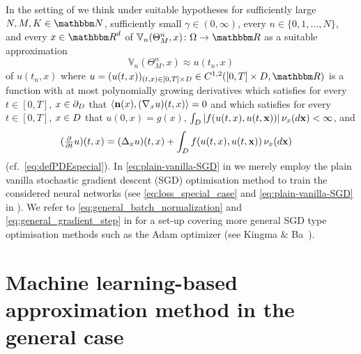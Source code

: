 %
%
In the setting of  we think under suitable hypotheses for sufficiently large  
$N, M, K \in \N$, sufficiently small 
$\gamma \in (0,\infty)$, every 
$n \in \{0, 1, \dots, N\}$, and every $x \in \R^d$ of $\mathbb V_n(\Theta^n_M,x)\colon \Omega \to \R$ as a suitable approximation
\begin{equation}
\mathbb V_n(\Theta^n_M,x) \approx u(t_n,x) %
\end{equation}
of $u(t_n,x)$
where
$
u=
(u(t,x))_{(t,x)\in [0,T]\times\D}\in C^{1,2}([0,T]\times\D,\R)
$
is a function with at most polynomially growing derivatives
which satisfies for every
$t\in [0,T]$,
$x\in \partial_D$
that
$ \left<{\textbf n}(x) ,(\nabla_x u)(t,x)\right> = 0$
and which satisfies for every
$t\in [0,T]$,
$x\in D$
that
$u(0,x)=g(x)$,
$\int_D |f(u(t,x), \allowbreak u(t,{\textbf x})) | \, \nu_x(d{\textbf x}) < \infty$,
and
\begin{equation}
\begin{split}
(\tfrac{\partial}{\partial t}u)(t,x)
&=  (\Delta_x u)(t,x)
+
\int_{D} f(u(t,x),u(t,{\textbf x})) \, \nu_x(d{\textbf x})
\end{split}
\end{equation}
(cf.\ \eqref{eq:defPDEspecial}). In \eqref{eq:plain-vanilla-SGD} in  we merely employ the plain vanilla stochastic gradient descent (SGD) optimisation method to train the considered neural networks (see \eqref{eq:loss_special_case} and \eqref{eq:plain-vanilla-SGD} in ). We refer to \eqref{eq:general_batch_normalization} and \eqref{eq:general_gradient_step} in  for a set-up covering more general SGD type optimisation methods such as the Adam optimizer (see Kingma $\&$ Ba~\cite{Kingma2014}).

\section{Machine learning-based approximation method in the general case}
\label{sec:derivation_gen}

